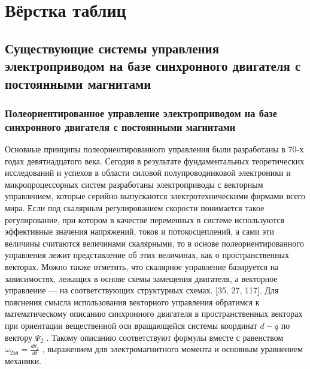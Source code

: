 \chapter{Вёрстка таблиц} \label{ch:ch3}

\section{Существующие системы управления электроприводом на базе синхронного двигателя с постоянными магнитами
} \label{sec:ch1/sec5}

\subsection{Полеориентированное управление электроприводом на базе синхронного двигателя с постоянными магнитами}
Основные принципы полеориентированного управления были разработаны в 70-х годах девятнадцатого века. Сегодня в результате фундаментальных теоретических исследований и успехов в области силовой полупроводниковой электроники и микропроцессорных систем разработаны электроприводы с векторным управлением, которые серийно выпускаются электротехническими фирмами всего мира. 
Если под скалярным регулированием скорости понимается такое регулирование, при котором в качестве переменных в системе используются эффективные значения напряжений, токов и потокосцеплений, а сами эти величины считаются величинами скалярными, то в основе полеориентированного управления лежит представление об этих величинах, как о пространственных векторах. Можно также отметить, что скалярное управление базируется на зависимостях, лежащих в основе схемы замещения двигателя, а векторное управление — на соответствующих структурных схемах. [35, 27, 117]. 
Для пояснения смысла использования векторного управления обратимся к математическому описанию синхронного двигателя в пространственных векторах при ориентации вещественной оси вращающейся системы координат $d-q$ по вектору ${\Psi }_{2}$ . Такому описанию соответствуют формулы  вместе с равенством $\omega_{2эл}=\frac{d \theta_{2}}{d t}$ , выражением для электромагнитного момента и основным уравнением механики. 

